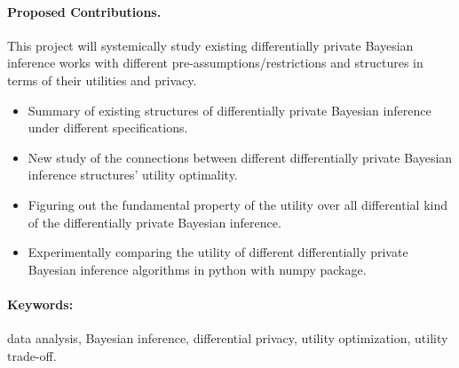 \documentclass{article}
\begin{document}
\paragraph{Proposed Contributions.}
This project will systemically study existing differentially private Bayesian inference works with different pre-assumptions/restrictions and structures in terms of their utilities and privacy.

\begin{itemize}
	\item Summary of existing structures of differentially private Bayesian inference under different specifications.
%
	\item New study of the connections between different differentially private Bayesian inference structures' utility optimality. 
%	
	\item Figuring out the fundamental property of the utility over all differential kind of the differentially private Bayesian inference.
%
	\item Experimentally comparing the utility of different differentially private Bayesian inference algorithms in python with numpy package.
\end{itemize}


\paragraph{Keywords:} data analysis, Bayesian inference, differential privacy, utility optimization, utility trade-off.

\newpage


\end{document}
